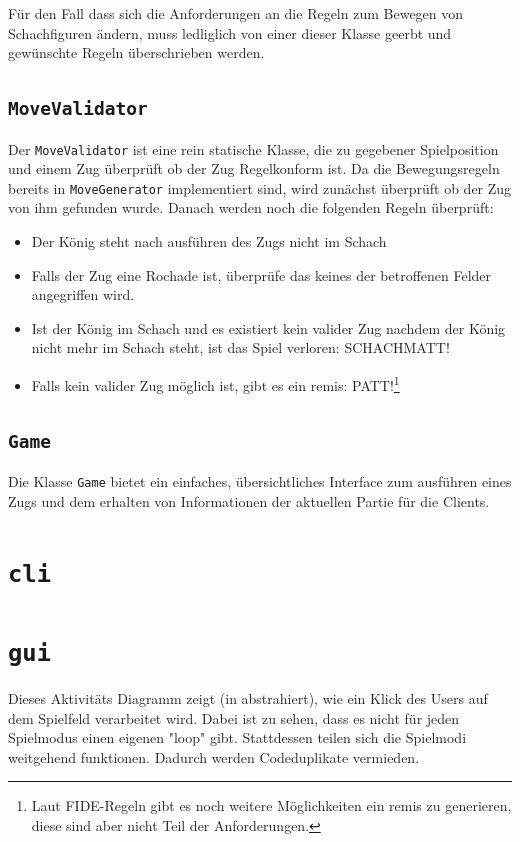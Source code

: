 \documentclass{scrreprt}
\newcommand{\lstinlinejava}[1]{\lstinline[language=java]{#1}}
\newcommand{\lstj}[1]{\lstinlinejava{#1}}
\begin{document}
Für den Fall dass sich die Anforderungen an die Regeln zum Bewegen von Schachfiguren ändern, muss ledliglich von einer dieser Klasse geerbt und gewünschte Regeln überschrieben werden.


\section{\lstj{MoveValidator}}
Der \lstj{MoveValidator} ist eine rein statische Klasse, die zu gegebener Spielposition und einem Zug überprüft ob der Zug Regelkonform ist. Da die Bewegungsregeln bereits in \lstj{MoveGenerator} implementiert sind, wird zunächst überprüft ob der Zug von ihm gefunden wurde. Danach werden noch die folgenden Regeln überprüft:

\begin{itemize}
\item
  Der König steht nach ausführen des Zugs nicht im Schach
  
\item
  Falls der Zug eine Rochade ist, überprüfe das keines der betroffenen Felder angegriffen wird.
  
\item
  Ist der König im Schach und es existiert kein valider Zug nachdem der König nicht mehr im Schach steht, ist das Spiel verloren: SCHACHMATT!
  
\item
  Falls kein valider Zug möglich ist, gibt es ein remis: PATT!\footnote{Laut FIDE-Regeln gibt es noch weitere Möglichkeiten ein remis zu generieren, diese sind aber nicht Teil der Anforderungen.}
\end{itemize}



\section{\lstj{Game}}

Die Klasse \lstj{Game} bietet ein einfaches, übersichtliches Interface zum ausführen eines Zugs und dem erhalten von Informationen der aktuellen Partie für die Clients.




\chapter{\lstj{cli}}


\chapter{\lstj{gui}}
Dieses Aktivitäts Diagramm zeigt (in abstrahiert), wie ein Klick des Users auf dem Spielfeld verarbeitet wird.
Dabei ist zu sehen, dass es nicht für jeden Spielmodus einen eigenen "loop" gibt.
Stattdessen teilen sich die Spielmodi weitgehend funktionen. Dadurch werden Codeduplikate vermieden.
\end{document}
